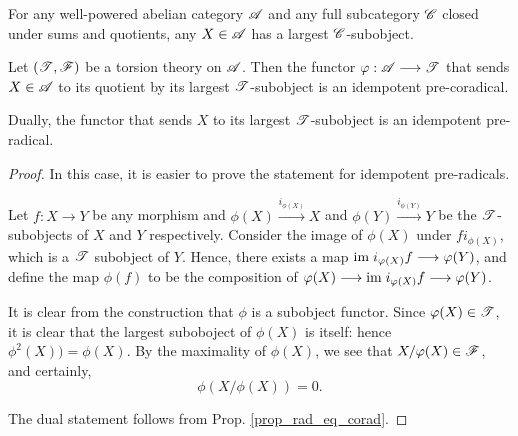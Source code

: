 \begin{por}
For any well-powered abelian category $\mathscr{A}$ and any full 
subcategory $\mathscr{C}$ closed under sums and quotients, any $X \in 
\mathscr{A}$ has a largest $\mathscr{C}$-subobject.
\end{por}

\begin{prop}\label{prop_tt_to_corad}
Let $(\mathscr{T}, \mathscr{F})$ be a torsion theory on $\mathscr{A}$. Then
the functor $\varphi: \mathscr{A} \longrightarrow \mathscr{T}$ that sends $X \in \mathscr{A}$
to its quotient by its largest $\mathscr{T}$-subobject is an 
idempotent pre-coradical.

Dually, the functor that sends $X$ to its largest 
$\mathscr{T}$-subobject is an idempotent pre-radical.
\end{prop}
\begin{proof}
In this case, it is easier to prove the statement for idempotent 
pre-radicals.

Let $f: X \to Y$ be any morphism and $\phi(X) 
\stackrel{i_{\phi(X)}}{\to} X$ and 
$\phi(Y)\stackrel{i_{\phi(Y)}}{\to} Y$ be the $\mathscr{T}$-subobjects 
of $X$ and $Y$ respectively. Consider the image of $\phi(X)$ under 
$f i_{\phi(X)}$, which is a $\mathscr{T}$ subobject of $Y$. Hence, 
there exists a map $\mathrm{im}\; i_{\varphi(X)}f \longrightarrow \varphi(Y)$, and define the 
map $\phi(f)$ to be the composition of $\varphi(X) \longrightarrow \mathrm{im}\; 
i_{\varphi(X)}f \longrightarrow \varphi(Y)$.

It is clear from the construction that $\phi$ is a subobject functor.
Since $\varphi(X) \in \mathscr{T}$, it is clear that the largest suboboject
of $\phi(X)$ is itself: hence $\phi^2(X)) = \phi(X)$. By the 
maximality of $\phi(X)$, we see that $X/\varphi(X) \in \mathscr{F}$, and
certainly, 
\[
\phi(X/\phi(X)) = 0.
\]

The dual statement follows from Prop. \ref{prop_rad_eq_corad}.
\end{proof}

